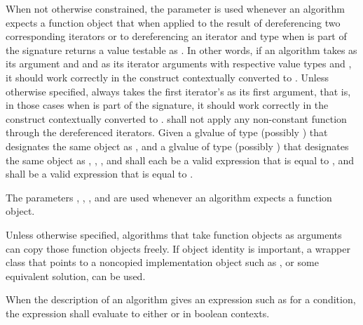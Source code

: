 \pnum
When not otherwise constrained, the  parameter is used
whenever an algorithm expects a function object that when applied
to the result of dereferencing two corresponding iterators or
to dereferencing an iterator and type 
when  is part of the signature
returns a value testable as .
In other words,
if an algorithm takes  as its argument and
 and  as its iterator arguments
with respective value types  and ,
it should work correctly in the construct
 contextually converted to .
Unless otherwise specified,
 always takes the first iterator's 
as its first argument, that is, in those cases when 
is part of the signature, it should work correctly in the construct
 contextually converted to .
 shall not apply any non-constant function
through the dereferenced iterators.
Given a glvalue  of type (possibly ) 
that designates the same object as , and
a glvalue  of type (possibly ) 
that designates the same object as ,
,
, and
shall each be a valid expression that is equal to
, and
shall be a valid expression that is equal to
.

\pnum
The parameters
,
,
,
and 
are used
whenever an algorithm expects a function object.

\pnum
\begin{note}
Unless otherwise specified, algorithms that take function objects as arguments
can copy those function objects freely.
If object identity is important,
a wrapper class that points to a noncopied implementation object
such as , or some equivalent solution,
can be used.
\end{note}

\pnum
When the description of an algorithm gives an expression such as
 for a condition, the expression
shall evaluate to either  or  in boolean contexts.

